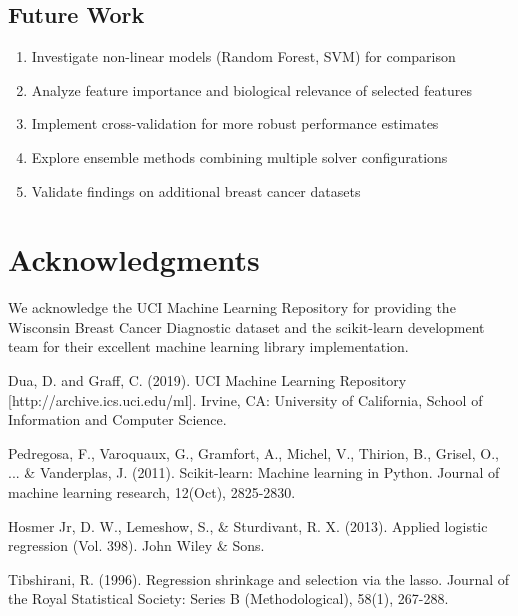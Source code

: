 \documentclass[12pt,a4paper]{article}
\begin{document}
\subsection{Future Work}

\begin{enumerate}
    \item Investigate non-linear models (Random Forest, SVM) for comparison
    \item Analyze feature importance and biological relevance of selected features
    \item Implement cross-validation for more robust performance estimates
    \item Explore ensemble methods combining multiple solver configurations
    \item Validate findings on additional breast cancer datasets
\end{enumerate}

\section{Acknowledgments}

We acknowledge the UCI Machine Learning Repository for providing the Wisconsin Breast Cancer Diagnostic dataset and the scikit-learn development team for their excellent machine learning library implementation.

\begin{thebibliography}{9}

Dua, D. and Graff, C. (2019). UCI Machine Learning Repository [http://archive.ics.uci.edu/ml]. Irvine, CA: University of California, School of Information and Computer Science.

Pedregosa, F., Varoquaux, G., Gramfort, A., Michel, V., Thirion, B., Grisel, O., ... \& Vanderplas, J. (2011). Scikit-learn: Machine learning in Python. Journal of machine learning research, 12(Oct), 2825-2830.

Hosmer Jr, D. W., Lemeshow, S., \& Sturdivant, R. X. (2013). Applied logistic regression (Vol. 398). John Wiley \& Sons.

Tibshirani, R. (1996). Regression shrinkage and selection via the lasso. Journal of the Royal Statistical Society: Series B (Methodological), 58(1), 267-288.

\end{thebibliography}
\end{document}

